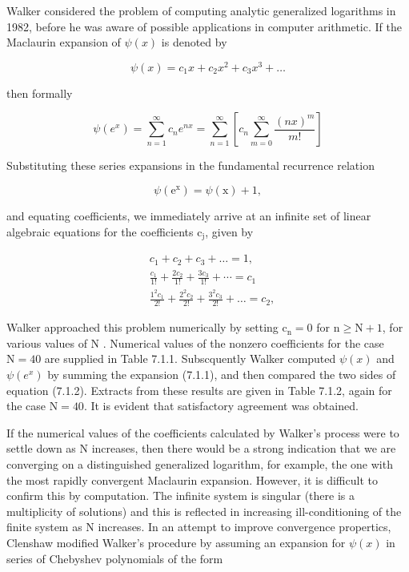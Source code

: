 \documentclass[10pt]{article}
\begin{document}
Walker considered the problem of computing analytic generalized logarithms in 1982, before he was aware of possible applications in computer arithmetic. If the Maclaurin expansion of $\psi(x)$ is denoted by


\begin{equation*}
\psi(x)=c_{1} x+c_{2} x^{2}+c_{3} x^{3}+\ldots \tag{7.1.1}
\end{equation*}


then formally

$$
\psi\left(e^{x}\right)=\sum_{n=1}^{\infty} c_{n} e^{n x}=\sum_{n=1}^{\infty}\left[c_{n} \sum_{m=0}^{\infty} \frac{(n x)^{m}}{m!}\right]
$$

Substituting these series expansions in the fundamental recurrence relation


\begin{equation*}
\psi\left(\mathrm{e}^{\mathrm{x}}\right)=\psi(\mathrm{x})+1, \tag{7.1.2}
\end{equation*}


and equating coefficients, we immediately arrive at an infinite set of linear algebraic equations for the coefficients $\mathrm{c}_{\mathrm{j}}$, given by

$$
\begin{aligned}
& c_{1}+c_{2}+c_{3}+\ldots=1, \\
& \frac{c_{1}}{1!}+\frac{2 c_{2}}{1!}+\frac{3 c_{3}}{1!}+\cdots=c_{1} \\
& \frac{1^{2} c_{1}}{2!}+\frac{2^{2} c_{2}}{2!}+\frac{3^{2} c_{3}}{2!}+\ldots=c_{2},
\end{aligned}
$$

Walker approached this problem numerically by setting $\mathrm{c}_{\mathrm{n}}=0$ for $\mathrm{n} \geqslant \mathrm{N}+1$, for various values of N . Numerical values of the nonzero coefficients for the case $\mathrm{N}=40$ are supplied in Table 7.1.1. Subscquently Walker computed $\psi(x)$ and $\psi\left(e^{x}\right)$ by summing the expansion (7.1.1), and then compared the two sides of equation (7.1.2). Extracts from these results are given in Table 7.1.2, again for the case $\mathrm{N}=40$. It is evident that satisfactory agreement was obtained.

If the numerical values of the coefficients calculated by Walker's process were to settle down as N increases, then there would be a strong indication that we are converging on a distinguished generalized logarithm, for example, the one with the most rapidly convergent Maclaurin expansion. However, it is difficult to confirm this by computation. The infinite system is singular (there is a multiplicity of solutions) and this is reflected in increasing ill-conditioning of the finite system as N increases. In an attempt to improve convergence propertics, Clenshaw modified Walker's procedure by assuming an expansion for $\psi(x)$ in series of Chebyshev polynomials of the form
\end{document}

